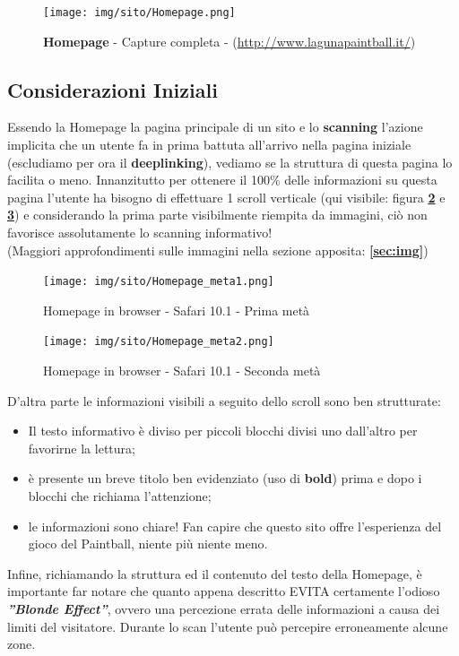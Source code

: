 \documentclass[../Relazione.tex]{subfiles}
\begin{document}
        \begin{figure}[!h]
            \centering
            \texttt{[image: img/sito/Homepage.png]}
            \caption{\textbf{Homepage} - Capture completa - (\url{http://www.lagunapaintball.it/})}
            \label{fig:homepage}
        \end{figure}

    \subsection{Considerazioni Iniziali}
    Essendo la Homepage la pagina principale di un sito e lo \textbf{scanning} l'azione implicita che un utente fa in prima battuta all'arrivo nella pagina iniziale (escludiamo per ora il \textbf{deeplinking}), vediamo se la struttura di questa pagina lo facilita o meno.
    Innanzitutto per ottenere il 100\% delle informazioni su questa pagina l'utente ha bisogno di effettuare 1 scroll verticale (qui visibile: figura \textbf{\ref{fig:scroll}} e \textbf{\ref{fig:scroll2}}) e considerando la prima parte visibilmente riempita da immagini, ciò non favorisce assolutamente lo scanning informativo!\\
    {\footnotesize(Maggiori approfondimenti sulle immagini nella sezione apposita: \textbf{\ref{sec:img}})}

\newpage

        \begin{figure}[!h]
            \centering
            \texttt{[image: img/sito/Homepage\_meta1.png]}
            \caption{Homepage in browser - Safari 10.1 - Prima metà}
            \label{fig:scroll}
        \end{figure}

        \begin{figure}[!h]
            \centering
            \texttt{[image: img/sito/Homepage\_meta2.png]}
            \caption{Homepage in browser - Safari 10.1 - Seconda metà}
            \label{fig:scroll2}
        \end{figure}

    D'altra parte le informazioni visibili a seguito dello scroll sono ben strutturate:
        \begin{itemize}
            \item Il testo informativo è diviso per piccoli blocchi divisi uno dall'altro per favorirne la lettura;
            \item è presente un breve titolo ben evidenziato (uso di \textbf{bold}) prima e dopo i blocchi che richiama l'attenzione;
            \item le informazioni sono chiare! Fan capire che questo sito offre l'esperienza del gioco del Paintball, niente più niente meno.
        \end{itemize}
    Infine, richiamando la struttura ed il contenuto del testo della Homepage, è importante far notare che quanto appena descritto EVITA certamente l'odioso \textbf{{\emph{''Blonde Effect''}}}, ovvero una percezione errata delle informazioni a causa dei limiti del visitatore. Durante lo scan l'utente può percepire erroneamente alcune zone.\vspace*{0,3cm}
\end{document}
